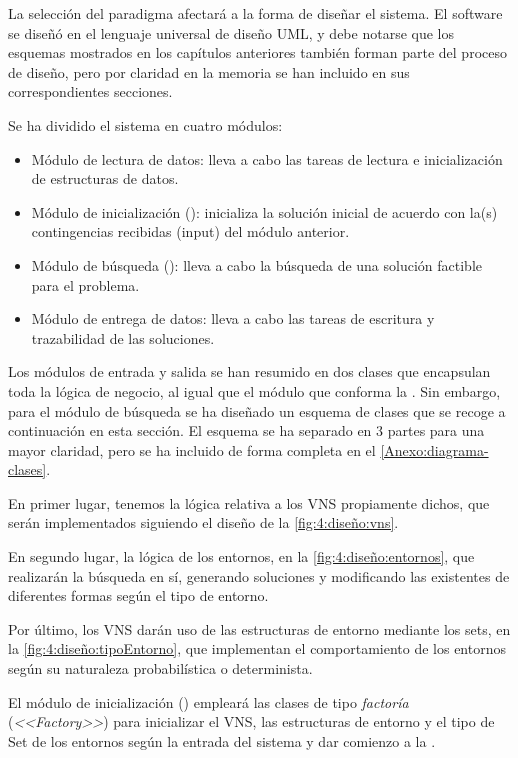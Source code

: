 La selección del paradigma afectará a la forma de diseñar el sistema. El software se diseñó en el lenguaje universal de diseño UML, y debe notarse que los esquemas mostrados en los capítulos anteriores también forman parte del proceso de diseño, pero por claridad en la memoria se han incluido en sus correspondientes secciones.

Se ha dividido el sistema en cuatro módulos:
\begin{itemize}
	\item Módulo de lectura de datos: lleva a cabo las tareas de lectura e inicialización de estructuras de datos.
	\item Módulo de inicialización (\faseuno{}): inicializa la solución inicial de acuerdo con la(s) contingencias recibidas (input) del módulo anterior.
	\item Módulo de búsqueda (\fasedos{}): lleva a cabo la búsqueda de una solución factible para el problema.
	\item Módulo de entrega de datos: lleva a cabo las tareas de escritura y trazabilidad de las soluciones.
\end{itemize}

Los módulos de entrada y salida se han resumido en dos clases que encapsulan toda la lógica de negocio, al igual que el módulo que conforma la \faseuno{}. Sin embargo, para el módulo de búsqueda se ha diseñado un esquema de clases que se recoge a continuación en esta sección. El esquema se ha separado en 3 partes para una mayor claridad, pero se ha incluido de forma completa en el \autoref{Anexo:diagrama-clases}. 

En primer lugar, tenemos la lógica relativa a los VNS propiamente dichos, que serán implementados siguiendo el diseño de la \autoref{fig:4:diseño:vns}.

En segundo lugar, la lógica de los entornos, en la \autoref{fig:4:diseño:entornos}, que realizarán la búsqueda en sí, generando soluciones y modificando las existentes de diferentes formas según el tipo de entorno.

Por último, los VNS darán uso de las estructuras de entorno mediante los sets, en la \autoref{fig:4:diseño:tipoEntorno}, que implementan el comportamiento de los entornos según su naturaleza probabilística o determinista.

El módulo de inicialización (\faseuno{}) empleará las clases de tipo \textit{factoría} (\textit{<<Factory>>}) para inicializar el VNS, las estructuras de entorno y el tipo de Set de los entornos según la entrada del sistema y dar comienzo a la \faseuno{}.

